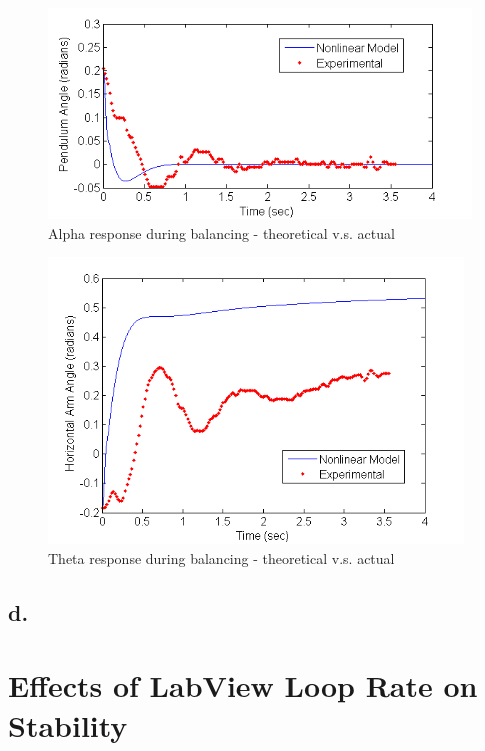 \documentclass{article}
\theoremstyle{plain}
\theoremstyle{definition}
\theoremstyle{remark}
\begin{document}
\begin{figure}[htb]
\begin{center}
\includegraphics[width = 12cm]{Q6_C_Alpha.png}
\end{center}
\caption{Alpha response during balancing - theoretical v.s. actual}
\label{q6_c_alpha}
\end{figure}

\begin{figure}[htb]
\begin{center}
\includegraphics[width = 11cm]{Q6_C_Theta.png}
\end{center}
\caption{Theta response during balancing - theoretical v.s. actual}
\label{q6_c_theta}
\end{figure}

\clearpage

\subsection*{d.}

\clearpage
\section{Effects of LabView Loop Rate on Stability}
\end{document}
